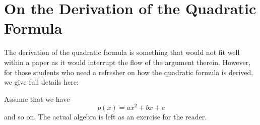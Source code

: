 \documentclass[final,3p,times,twocolumn]{elsarticle}
\numberwithin{equation}{section}
\begin{document}
\appendix

\section{On the Derivation of the Quadratic Formula}
\label{app:quad}
The derivation of the quadratic formula is something that would not
fit well within a paper as it would interrupt the flow of the argument
therein. However, for those students who need a refresher on how the
quadratic formula is derived, we give full details here:\par
Assume that we have
\begin{equation}
p(x) = ax^2 + bx + c
\end{equation}
and so on. The actual algebra is left as an exercise for the reader.











\end{document}
